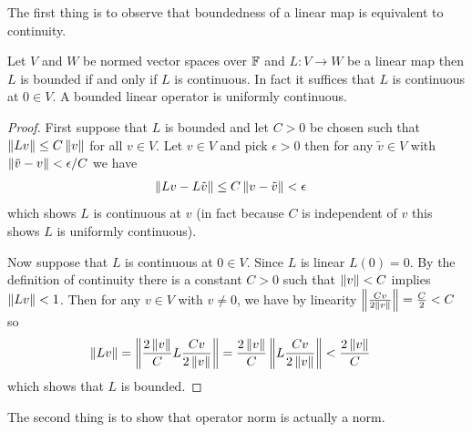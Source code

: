 The first thing is to observe that boundedness of a linear map is
equivalent to continuity.
\begin{prop}\label{banach:BoundedEquivalentContinuous}Let $V$ and $W$
  be normed vector spaces over $\mathbb{F}$ and $L : V \to W$ be a linear
  map then $L$ is bounded if and only if $L$ is continuous.  In fact
  it suffices that $L$ is continuous at $0 \in V$.   A bounded linear
  operator is uniformly continuous.
\end{prop}
\begin{proof}
  First suppose that $L$ is bounded and let $C > 0$ be chosen such
  that $\left \lVert Lv \right \rVert \leq C \left \lVert v \right \rVert$ for all $v \in V$.   Let $v \in V$
  and pick $\epsilon > 0$ then for any $\tilde{v} \in V$ with
  $\left \lVert \tilde{v} - v \right \rVert < \epsilon/C$ we have
  \begin{align*}
    \left \lVert Lv - L \tilde{v} \right \rVert &\leq C \left \lVert v - \tilde{v} \right \rVert < \epsilon
  \end{align*}
  which shows $L$ is continuous at $v$ (in fact because $C$ is
  independent of $v$ this shows $L$ is
  uniformly continuous).

  Now suppose that $L$ is 
  continuous at $0 \in V$.   Since $L$ is linear $L(0) = 0$. By the definition of continuity there is a constant $C>0$ such that $\left \lVert v \right \rVert < C$
  implies $\left \lVert Lv \right \rVert < 1$.   Then for any $v
  \in V$ with $v \neq 0$, we have by linearity
  $\left \lVert \frac{Cv}{2\left \lVert v \right \rVert} \right \rVert = \frac{C}{2} < C$ so
  \begin{align*}
    \left \lVert Lv \right \rVert &= \left \lVert \frac{2\left \lVert v \right \rVert}{C}  L \frac{Cv}{2\left \lVert v \right \rVert} \right \rVert
                =\frac{2 \left \lVert v \right \rVert}{C}\left \lVert  L \frac{Cv}{2\left \lVert v \right \rVert} \right \rVert < \frac{2 \left \lVert v \right \rVert}{C}
  \end{align*}
  which shows that $L$ is bounded.
\end{proof}

The second thing is to show that operator norm is actually a norm.

